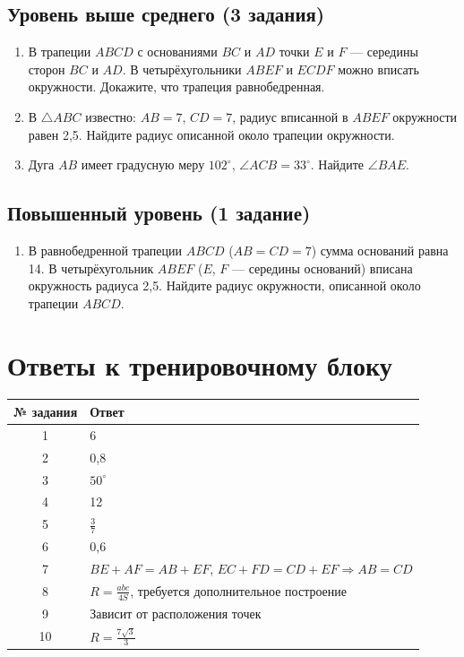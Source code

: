 \documentclass[a4paper,12pt]{article}
\begin{document}
\subsection*{Уровень выше среднего (3 задания)}
\begin{enumerate}[label=\arabic*., leftmargin=*, start=7]
    \item В трапеции $ABCD$ с основаниями $BC$ и $AD$ точки $E$ и $F$ — середины сторон $BC$ и $AD$. В четырёхугольники $ABEF$ и $ECDF$ можно вписать окружности. Докажите, что трапеция равнобедренная.
    
    \item В $\triangle ABC$ известно: $AB = 7$, $CD = 7$, радиус вписанной в $ABEF$ окружности равен 2{,}5. Найдите радиус описанной около трапеции окружности.
    
    \item Дуга $AB$ имеет градусную меру $102^\circ$, $\angle ACB = 33^\circ$. Найдите $\angle BAE$.
\end{enumerate}

\subsection*{Повышенный уровень (1 задание)}
\begin{enumerate}[label=\arabic*., leftmargin=*, start=10]
    \item В равнобедренной трапеции $ABCD$ ($AB = CD = 7$) сумма оснований равна 14. В четырёхугольник $ABEF$ ($E$, $F$ — середины оснований) вписана окружность радиуса 2{,}5. Найдите радиус окружности, описанной около трапеции $ABCD$.
\end{enumerate}

\newpage

\section*{Ответы к тренировочному блоку}

\begin{center}
\renewcommand{\arraystretch}{1.5}
\begin{tabular}{cl}
\toprule
\textbf{№ задания} & \textbf{Ответ} \\
\midrule
1 & 6 \\
2 & 0{,}8 \\
3 & $50^\circ$ \\
4 & 12 \\
5 & $\frac{3}{7}$ \\
6 & 0{,}6 \\
7 & $BE + AF = AB + EF$, $EC + FD = CD + EF \Rightarrow AB = CD$ \\
8 & $R = \frac{abc}{4S}$, требуется дополнительное построение \\
9 & Зависит от расположения точек \\
10 & $R = \frac{7\sqrt{3}}{3}$ \\
\bottomrule
\end{tabular}
\end{center}
\end{document}
